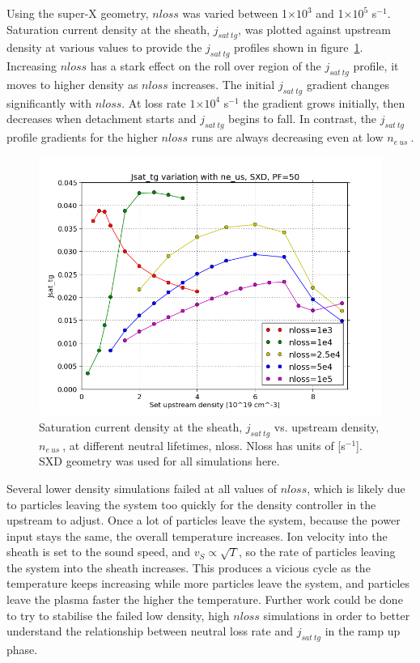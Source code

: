 \documentclass[12pt]{article}  %
\providecommand{\e}[1]{\ensuremath{\times 10^{#1}}} %
\providecommand{\pow}[1]{{$^{#1}$}} %
\providecommand{\neus}{$n_{e~us}~$} %
\begin{document}
Using the super-X geometry, $nloss$ was varied between 1\e{3} and 1\e{5} s\pow{-1}. Saturation current density at the sheath, $j_{sat~tg}$, was plotted against upstream density at various values to provide the $j_{sat~tg}$ profiles shown in figure~\ref{fignloss1e345,52.5e425_2}. Increasing $nloss$ has a stark effect on the roll over region of the $j_{sat~tg}$ profile, it moves to higher density as $nloss$ increases. The initial $j_{sat~tg}$ gradient changes significantly with $nloss$. At loss rate $1\e{4}$ s\pow{-1} the gradient grows initially, then decreases when detachment starts and $j_{sat~tg}$ begins to fall. In contrast, the $j_{sat~tg}$ profile gradients for the higher $nloss$ runs are always decreasing even at low \neus. 

\begin{figure}
\includegraphics[scale=0.5]{Figures/sol1d/nloss1e345,525e425_2.png}
\centering
\caption{Saturation current density at the sheath, $j_{sat~tg}$ vs. upstream density, \neus, at different neutral lifetimes, nloss. Nloss has units of [s\pow{-1}]. SXD geometry was used for all simulations here.}\label{fignloss1e345,52.5e425_2}
\end{figure}

Several lower density simulations failed at all values of $nloss$, which is likely due to particles leaving the system too quickly for the density controller in the upstream to adjust. Once a lot of particles leave the system, because the power input stays the same, the overall temperature increases. Ion velocity into the sheath is set to the sound speed, and $v_S \propto \sqrt{T}$, so the rate of particles leaving the system into the sheath increases. This produces a vicious cycle as the temperature keeps increasing while more particles leave the system, and particles leave the plasma faster the higher the temperature. Further work could be done to try to stabilise the failed low density, high $nloss$ simulations in order to better understand the relationship between neutral loss rate and $j_{sat~tg}$ in the ramp up phase.
\end{document}
